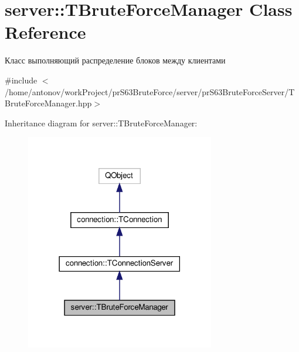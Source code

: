 \hypertarget{classserver_1_1_t_brute_force_manager}{}\section{server\+:\+:T\+Brute\+Force\+Manager Class Reference}
\label{classserver_1_1_t_brute_force_manager}


Класс выполняющий распределение блоков между клиентами  




{\ttfamily \#include $<$/home/antonov/work\+Project/pr\+S63\+Brute\+Force/server/pr\+S63\+Brute\+Force\+Server/\+T\+Brute\+Force\+Manager.\+hpp$>$}



Inheritance diagram for server\+:\+:T\+Brute\+Force\+Manager\+:\nopagebreak
\begin{figure}[H]
\begin{center}
\leavevmode
\includegraphics[width=234pt]{classserver_1_1_t_brute_force_manager__inherit__graph}
\end{center}
\end{figure}


